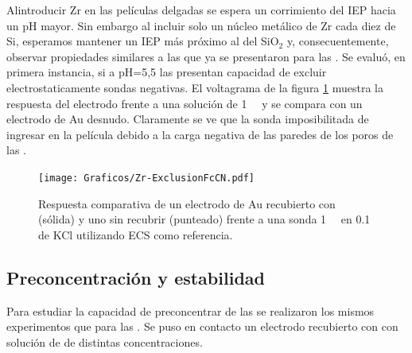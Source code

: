 	 	 Al\space introducir Zr en las películas delgadas se espera un corrimiento del IEP hacia un pH mayor\cite{Kosmulski2014}. Sin embargo al incluir solo un núcleo metálico de Zr cada diez de Si, esperamos mantener un IEP más próximo al del SiO$_2$ y, consecuentemente, observar propiedades similares a las que ya se presentaron para las \pdmF.
	 	 Se evaluó, en primera instancia, si a pH=5,5 las \pdmZ\space presentan capacidad de excluir electrostaticamente sondas negativas. El voltagrama de la figura \ref{fig:fcn-zr} muestra la respuesta del electrodo frente a una solución de \fe\space \SI{1}{\milli\Molar} y se compara con un electrodo de Au  desnudo. Claramente se ve que la sonda imposibilitada de ingresar en la película debido a la carga negativa de las paredes de los poros de las \pdmZ. 
				
				\begin{figure}[ht]
				\centering
		 	    \texttt{[image: Graficos/Zr-ExclusionFcCN.pdf]}
		        \caption[Exclusión electrostática en \pdmZ]{Respuesta comparativa de un electrodo de Au  recubierto con \pdmZ\space (sólida) y uno sin recubrir (punteado) frente a una sonda \ferroferri\space \SI{1}{\milli\Molar} en \SI{0.1}{\Molar} de KCl utilizando ECS como referencia.}
		        \label{fig:fcn-zr}
		      	\end{figure} 
	 
	 \subsection{Preconcentración y estabilidad}\label{sub:pcirc}

		 	Para estudiar la capacidad de preconcentrar de las \pdmZ\space se realizaron los mismos experimentos que para las \pdmF. Se puso en contacto un electrodo recubierto con \pdmZ\space con solución de \ru\space de distintas concentraciones. 


